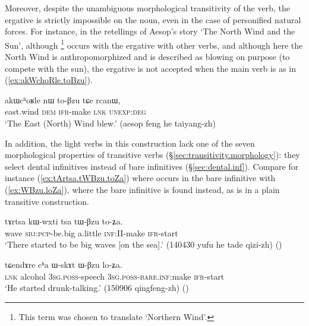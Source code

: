 Moreover, despite the unambiguous morphological transitivity of the verb, the ergative is strictly impossible on the noun,  even in the case of personified natural forces. For instance, in the retellings of Aesop's story `The North Wind and the Sun', although  \footnote{This term was chosen to translate `Northern Wind'.} occurs with the ergative with other verbs, and although here the North Wind is anthropomorphized and is described as blowing on purpose (to compete with the sun), the ergative is not accepted when the main verb is  as in (\ref{ex:akWchoRle.toBzu}).

\begin{exe}
\ex \label{ex:akWchoRle.toBzu}
\gll akɯcʰoʁle nɯ to-βzu tɕe rcanɯ, \\
east.wind \textsc{dem} \textsc{ifr}-make \textsc{lnk} \textsc{unexp}:\textsc{deg} \\
\glt `The East (North) Wind blew.' (aesop feng he taiyang-zh)
\end{exe}

In addition, the light verbs in this construction lack one of the seven morphological properties of transitive verbs (§\ref{sec:transitivity.morphology}): they select dental infinitives instead of bare infinitives (§\ref{sec:dental.inf}). Compare for instance (\ref{ex:tArtsa.tWBzu.toZa}) where  occurs in the bare infinitive  with (\ref{ex:WBzu.loZa}), where the bare infinitive  is found instead, as  is in a plain transitive construction.

\begin{exe}
\ex \label{ex:tArtsa.tWBzu.toZa}
\gll tɤrtsa kɯ-wxti tsa tɯ-βzu to-ʑa. \\
wave \textsc{sbj}:\textsc{pcp}-be.big a.little \textsc{inf}:II-make \textsc{ifr}-start \\
\glt `There started to be big waves [on the sea].' (140430 yufu he tade qizi-zh)
()
\end{exe}

\begin{exe}
\ex \label{ex:WBzu.loZa}
\gll tɕendɤre cʰa ɯ-skɤt ɯ-βzu lo-ʑa.  \\
\textsc{lnk} alcohol \textsc{3sg}.\textsc{poss}-speech \textsc{3sg}.\textsc{poss}-\textsc{bare}.\textsc{inf}:make \textsc{ifr}-start \\
\glt `He started drunk-talking.' (150906 qingfeng-zh)
()
\end{exe}

